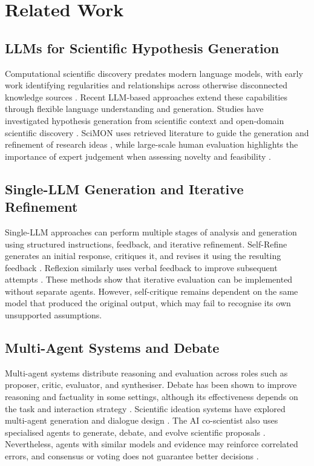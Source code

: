 \documentclass[sigconf,review,anonymous=false]{acmart}
\begin{document}
\section{Related Work}
\subsection{LLMs for Scientific Hypothesis Generation}
Computational scientific discovery predates modern language models, with early work identifying regularities and relationships across otherwise disconnected knowledge sources \cite{langley1987scientific,swanson1986undiscovered}. Recent LLM-based approaches extend these capabilities through flexible language understanding and generation. Studies have investigated hypothesis generation from scientific context and open-domain scientific discovery \cite{zhou2024hypothesis,yang2024large}. SciMON uses retrieved literature to guide the generation and refinement of research ideas \cite{wang2024scimon}, while large-scale human evaluation highlights the importance of expert judgement when assessing novelty and feasibility \cite{si2025novel}.

\subsection{Single-LLM Generation and Iterative Refinement}
Single-LLM approaches can perform multiple stages of analysis and generation using structured instructions, feedback, and iterative refinement. Self-Refine generates an initial response, critiques it, and revises it using the resulting feedback \cite{madaan2023selfrefine}. Reflexion similarly uses verbal feedback to improve subsequent attempts \cite{shinn2023reflexion}. These methods show that iterative evaluation can be implemented without separate agents. However, self-critique remains dependent on the same model that produced the original output, which may fail to recognise its own unsupported assumptions.

\subsection{Multi-Agent Systems and Debate}
Multi-agent systems distribute reasoning and evaluation across roles such as proposer, critic, evaluator, and synthesiser. Debate has been shown to improve reasoning and factuality in some settings, although its effectiveness depends on the task and interaction strategy \cite{du2024improving,smit2024mad}. Scientific ideation systems have explored multi-agent generation and dialogue design \cite{su2025many,ueda2025design}. The AI co-scientist also uses specialised agents to generate, debate, and evolve scientific proposals \cite{gottweis2025towards}. Nevertheless, agents with similar models and evidence may reinforce correlated errors, and consensus or voting does not guarantee better decisions \cite{choi2025debatevote}.
\end{document}
